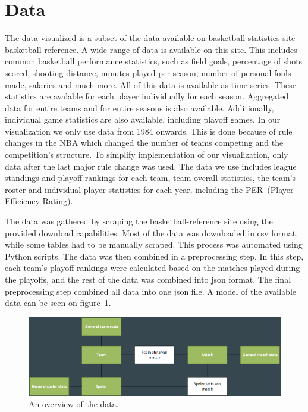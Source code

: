 \documentclass[chi_draft]{sigchi}
\begin{document}
\section{Data}\label{sec:data}
The data visualized is a subset of the data available on basketball statistics
site basketball-reference\cite{basketball-reference}. A wide range of data is
available on this site. This includes common basketball performance statistics,
such as field goals, percentage of shots scored, shooting distance, minutes
played per season, number of personal fouls made, salaries and much more. All of
this data is available as time-series. These
statistics are avalable for each player individually for each season. Aggregated
data for entire teams and for entire seasons is also available. Additionally,
individual game statistics are also available, including playoff games.  In our
visualization we only use data from 1984 onwards. This is done because of rule
changes in the NBA which changed the number of teams competing and the
competition's structure. To simplify implementation of our visualization, only
data after the last major rule change was used.  The data we use includes league
standings and playoff rankings for each team, team overall statistics, the
team's roster and individual player statistics for each year, including the
PER~(Player Efficiency Rating)\cite{per}. 

The data was gathered by scraping the basketball-reference site using the
provided download capabilities. Most of the data was downloaded in csv format,
while some tables had to be manually scraped. This process was automated using
Python scripts. The data was then combined in a preprocessing step. In this
step, each team's playoff rankings were calculated based on the matches played
during the playoffs, and the rest of the data was combined into json format. The
final preprocessing step combined all data into one json file. A model of the
available data can be seen on figure~\ref{fig:data}.

\begin{figure}
\centering
  \includegraphics[width=1.0\columnwidth]{figures/data}
  \caption{An overview of the data.}
  \label{fig:data}
\end{figure}
\end{document}
